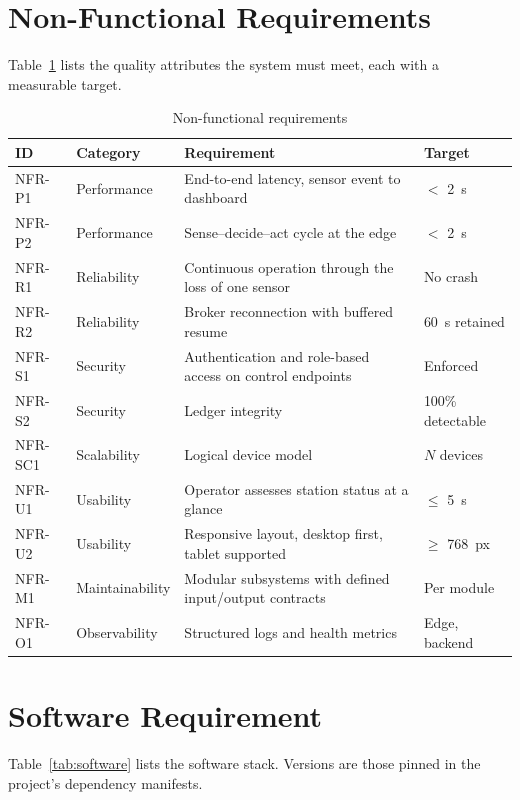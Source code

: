 \section{Non-Functional Requirements}

Table~\ref{tab:nfr} lists the quality attributes the system must meet, each with a measurable target.

\begin{table}[htbp]
\centering
\caption{Non-functional requirements}
\label{tab:nfr}
\small
\begin{tabularx}{\textwidth}{@{}l l X l@{}}
\toprule
\textbf{ID} & \textbf{Category} & \textbf{Requirement} & \textbf{Target} \\
\midrule
NFR-P1 & Performance & End-to-end latency, sensor event to dashboard & $<$ 2~s \\
NFR-P2 & Performance & Sense--decide--act cycle at the edge & $<$ 2~s \\
NFR-R1 & Reliability & Continuous operation through the loss of one sensor & No crash \\
NFR-R2 & Reliability & Broker reconnection with buffered resume & 60~s retained \\
NFR-S1 & Security & Authentication and role-based access on control endpoints & Enforced \\
NFR-S2 & Security & Ledger integrity & 100\% detectable \\
NFR-SC1 & Scalability & Logical device model & $N$ devices \\
NFR-U1 & Usability & Operator assesses station status at a glance & $\leq$ 5~s \\
NFR-U2 & Usability & Responsive layout, desktop first, tablet supported & $\geq$ 768~px \\
NFR-M1 & Maintainability & Modular subsystems with defined input/output contracts & Per module \\
NFR-O1 & Observability & Structured logs and health metrics & Edge, backend \\
\bottomrule
\end{tabularx}
\end{table}

\section{Software Requirement}

Table~\ref{tab:software} lists the software stack. Versions are those pinned in the project's dependency manifests.

